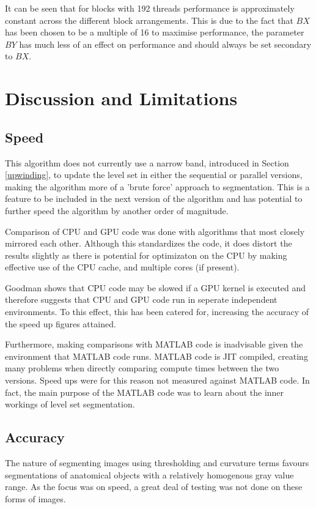It can be seen that for blocks with 192 threads performance is approximately constant across the different block arrangements. This is due to the fact that $BX$ has been chosen to be a multiple of 16 to maximise performance, the parameter $BY$ has much less of an effect on performance and should always be set secondary to $BX$.



\section{Discussion and Limitations}

\subsection{Speed}
This algorithm does not currently use a narrow band, introduced in Section \ref{upwinding}, to update the level set in either the sequential or parallel versions, making the algorithm more of a 'brute force' approach to segmentation. This is a feature to be included in the next version of the algorithm and has potential to further speed the algorithm by another order of magnitude.

Comparison of CPU and GPU code was done with algorithms that most closely mirrored each other. Although this standardizes the code, it does distort the results slightly as there is potential for optimizaton on the CPU by making effective use of the CPU cache, and multiple cores (if present). 

Goodman \cite{goodman} shows that CPU code may be slowed if a GPU kernel is executed and therefore suggests that CPU and GPU code run in seperate independent environments. To this effect, this has been catered for, increasing the accuracy of the speed up figures attained.

Furthermore, making comparisons with MATLAB code is inadvisable given the environment that MATLAB code runs. MATLAB code is JIT compiled, creating many problems when directly comparing compute times between the two versions. Speed ups were for this reason not measured against MATLAB code. In fact, the main purpose of the MATLAB code was to learn about the inner workings of level set segmentation.


\subsection{Accuracy}
The nature of segmenting images using thresholding and curvature terms favours segmentations of anatomical objects with a relatively homogenous gray value range. As the focus was on speed, a great deal of testing was not done on these forms of images.
	
